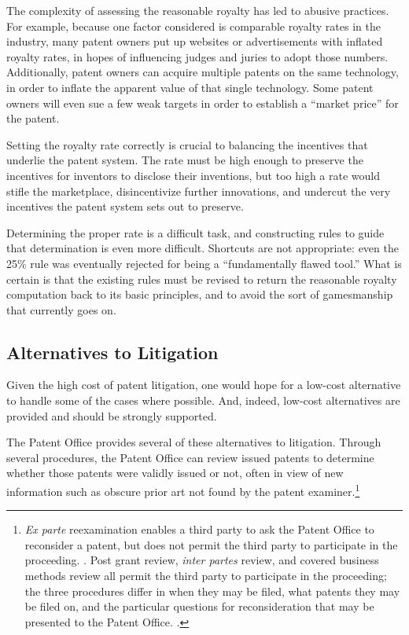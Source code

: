 \documentclass[11pt,twocolumn,titlepage]{article}
\begin{document}
The complexity of assessing the reasonable royalty has led to abusive practices.
For example, because one factor considered is comparable royalty rates in the
industry, many patent owners put up websites or advertisements with inflated
royalty rates, in hopes of influencing judges and juries to adopt those numbers.
Additionally, patent owners can acquire multiple patents on the same technology,
in order to inflate the apparent value of that single technology. Some patent
owners will even sue a few weak targets in order to establish a ``market price''
for the patent.

Setting the royalty rate correctly is crucial to balancing the incentives that
underlie the patent system. The rate must be high enough to preserve the
incentives for inventors to disclose their inventions, but too high a rate would
stifle the marketplace, disincentivize further innovations, and undercut the
very incentives the patent system sets out to preserve.

Determining the proper
rate is a difficult task, and constructing rules to guide that determination is
even more difficult.
Shortcuts are not appropriate: even the 25\% rule was eventually rejected for
being a ``fundamentally flawed tool.''
What is certain is that the existing rules must be
revised to return the reasonable royalty computation back to its basic
principles, and to avoid the sort of gamesmanship that currently goes on.

\subsection{Alternatives to Litigation}
\SectionNote

Given the high cost of patent litigation, one would hope for a low-cost
alternative to handle some of the cases where possible. And, indeed, low-cost
alternatives are provided and should be strongly supported.

The Patent Office provides several of these alternatives to litigation. Through
several procedures, the Patent Office can review issued patents to determine
whether those patents were validly issued or not, often in view of new
information such as obscure prior art not found by the patent
examiner.\footnote{\emph{Ex parte} reexamination enables a third party to ask
the Patent Office to reconsider a patent, but does not permit the third party to
participate in the proceeding. . Post grant review, \emph{inter partes} review, and covered business
methods review all permit the third party to participate in the proceeding; the
three procedures differ in when they may be filed, what patents they may be
filed on, and the particular questions for reconsideration that may be presented
to the Patent Office. .}
\end{document}
